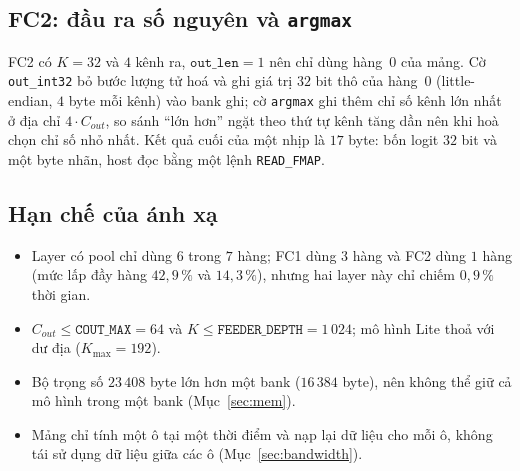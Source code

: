 \subsection{FC2: đầu ra số nguyên và \texttt{argmax}}
FC2 có $K=32$ và $4$ kênh ra, $\texttt{out\_len}=1$ nên chỉ dùng hàng~0 của mảng.
Cờ \texttt{out\_int32} bỏ bước lượng tử hoá và ghi giá trị $32$ bit thô của hàng~0 (little-endian, $4$ byte mỗi kênh) vào bank ghi; cờ \texttt{argmax} ghi thêm chỉ số kênh lớn nhất ở địa chỉ $4\cdot C_{out}$, so sánh ``lớn hơn'' ngặt theo thứ tự kênh tăng dần nên khi hoà chọn chỉ số nhỏ nhất.
Kết quả cuối của một nhịp là $17$ byte: bốn logit $32$ bit và một byte nhãn, host đọc bằng một lệnh \texttt{READ\_FMAP}.

\subsection{Hạn chế của ánh xạ}
\begin{itemize}
  \item Layer có pool chỉ dùng $6$ trong $7$ hàng; FC1 dùng $3$ hàng và FC2 dùng $1$ hàng (mức lấp đầy hàng $42{,}9\,\%$ và $14{,}3\,\%$), nhưng hai layer này chỉ chiếm $0{,}9\,\%$ thời gian.
  \item $C_{out}\le\texttt{COUT\_MAX}=64$ và $K\le\texttt{FEEDER\_DEPTH}=1\,024$; mô hình Lite thoả với dư địa ($K_{\max}=192$).
  \item Bộ trọng số $23\,408$ byte lớn hơn một bank ($16\,384$ byte), nên không thể giữ cả mô hình trong một bank (Mục~\ref{sec:mem}).
  \item Mảng chỉ tính một ô tại một thời điểm và nạp lại dữ liệu cho mỗi ô, không tái sử dụng dữ liệu giữa các ô (Mục~\ref{sec:bandwidth}).
\end{itemize}
